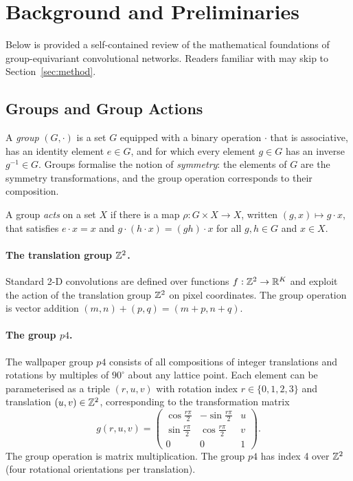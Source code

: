 \section{Background and Preliminaries}
\label{sec:background}

Below is provided a self-contained review of the mathematical foundations of group-equivariant
convolutional networks. Readers familiar with \citet{cohen2016group} may skip to
Section~\ref{sec:method}.

\subsection{Groups and Group Actions}

A \emph{group} \((G, \cdot)\) is a set \(G\) equipped with a binary operation \(\cdot\) that is
associative, has an identity element \(e \in G\), and for which every element \(g \in G\)
has an inverse \(g^{-1} \in G\). Groups formalise the notion of \emph{symmetry}: the elements
of \(G\) are the symmetry transformations, and the group operation corresponds to their
composition.

A group \emph{acts} on a set \(X\) if there is a map \(\rho: G \times X \to X\),
written \((g, x) \mapsto g \cdot x\), that satisfies \(e \cdot x = x\) and
\(g \cdot (h \cdot x) = (gh) \cdot x\) for all \(g, h \in G\) and \(x \in X\).

\paragraph{The translation group \(\mathbb{Z}^2\).}
Standard 2-D convolutions are defined over functions \(f: \mathbb{Z}^2 \to \mathbb{R}^K\) and exploit the
action of the translation group \(\mathbb{Z}^2\) on pixel coordinates. The group operation is
vector addition \((m, n) + (p, q) = (m+p, n+q)\).

\paragraph{The group \(p4\).}
The wallpaper group \(p4\) consists of all compositions of integer translations and rotations
by multiples of \(90^\circ\) about any lattice point. Each element can be parameterised as
a triple \((r, u, v)\) with rotation index \(r \in \{0, 1, 2, 3\}\) and translation
\((u, v) \in \mathbb{Z}^2\), corresponding to the transformation matrix
\begin{equation}
  g(r, u, v) =
  \begin{pmatrix}
    \cos\!\tfrac{r\pi}{2} & -\sin\!\tfrac{r\pi}{2} & u \\
    \sin\!\tfrac{r\pi}{2} &  \cos\!\tfrac{r\pi}{2} & v \\
    0                     &  0                     & 1
  \end{pmatrix}.
  \label{eq:p4-matrix}
\end{equation}
The group operation is matrix multiplication. The group \(p4\) has index 4 over
\(\mathbb{Z}^2\) (four rotational orientations per translation).

